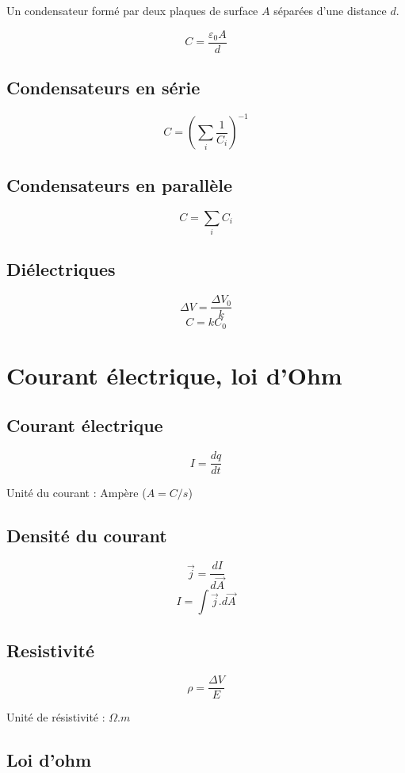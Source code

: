 \documentclass[a4paper,10pt,openright,titlepage]{report}
\begin{document}
Un condensateur formé par deux plaques de surface $A$ séparées d'une distance $d$.

$$C = \frac{\varepsilon_0 A}{d}$$

\subsection{Condensateurs en série}

$$C = \left( \sum_i \frac{1}{C_i} \right)^{-1}$$

\subsection{Condensateurs en parallèle}

$$C = \sum_i C_i$$

\subsection{Diélectriques}

$$\Delta V = \frac{\Delta V_0}{k}$$
$$C = k C_0$$

\section{Courant électrique, loi d'Ohm}

\subsection{Courant électrique}

$$I = \frac{dq}{dt}$$

Unité du courant : Ampère ($A = C/s$)

\subsection{Densité du courant}

$$\vec j = \frac{dI}{d {\vec A}}$$
$$I = \int \vec j.d\vec A$$

\subsection{Resistivité}

$$\rho = \frac{\Delta V}{E}$$

Unité de résistivité : $\Omega.m$

\subsection{Loi d'ohm}
\end{document}
